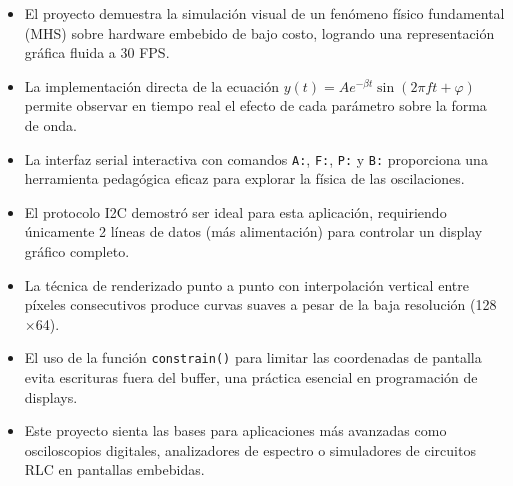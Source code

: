 \documentclass[12pt,a4paper]{article}
\begin{document}
\begin{itemize}
    \item El proyecto demuestra la simulación visual de un fenómeno físico fundamental (MHS) sobre hardware embebido de bajo costo, logrando una representación gráfica fluida a 30 FPS.
    \item La implementación directa de la ecuación $y(t) = A e^{-\beta t} \sin(2\pi f t + \varphi)$ permite observar en tiempo real el efecto de cada parámetro sobre la forma de onda.
    \item La interfaz serial interactiva con comandos \texttt{A:}, \texttt{F:}, \texttt{P:} y \texttt{B:} proporciona una herramienta pedagógica eficaz para explorar la física de las oscilaciones.
    \item El protocolo I2C demostró ser ideal para esta aplicación, requiriendo únicamente 2 líneas de datos (más alimentación) para controlar un display gráfico completo.
    \item La técnica de renderizado punto a punto con interpolación vertical entre píxeles consecutivos produce curvas suaves a pesar de la baja resolución (128$\times$64).
    \item El uso de la función \texttt{constrain()} para limitar las coordenadas de pantalla evita escrituras fuera del buffer, una práctica esencial en programación de displays.
    \item Este proyecto sienta las bases para aplicaciones más avanzadas como osciloscopios digitales, analizadores de espectro o simuladores de circuitos RLC en pantallas embebidas.
\end{itemize}
\end{document}
